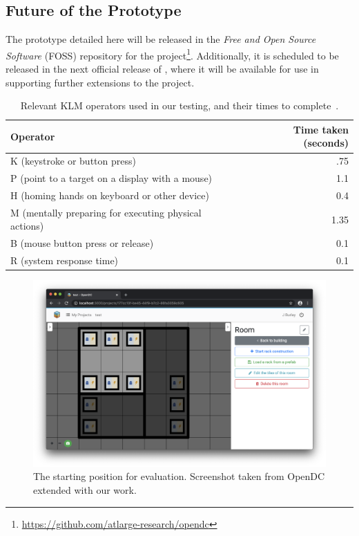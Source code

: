 \documentclass[11pt]{article}
\begin{document}
	\subsection{Future of the Prototype}
		The prototype detailed here will be released in the \textit{Free and Open Source Software} (FOSS) repository for the \opendc{} project\footnote{\url{https://github.com/atlarge-research/opendc}}.
		Additionally, it is scheduled to be released in the next official release of \opendc{}, where it will be available for use in supporting further extensions to the \opendc{} project.


\newpage

\begin{table}[h]
\centering
	\begin{tabular}{lr}
	\toprule
	Operator                                              & Time taken (seconds) \\ \midrule
	K (keystroke or button press)                         & .75                  \\
	P (point to a target on a display with a mouse)       & 1.1                  \\
	H (homing hands on keyboard or other device)          & 0.4                  \\
	M (mentally preparing for executing physical actions) & 1.35                 \\
	B (mouse button press or release)                     & 0.1                  \\
	R (system response time)							  &	   0.1                  \\
	\bottomrule
	\end{tabular}
\caption[Relevant KLM operators used in our testing, and their times to complete]{Relevant KLM operators used in our testing, and their times to complete~\cite{Newell1980}.}
\label{tab:3}
\end{table}


\begin{figure}[h]
	\centering
	\includegraphics[width=\textwidth]{frontendstartingpoint.png}
	\caption[The starting position for evaluation]{The starting position for evaluation. Screenshot taken from OpenDC extended with our work.}
	\label{fig:evalstart}
\end{figure}
\end{document}
